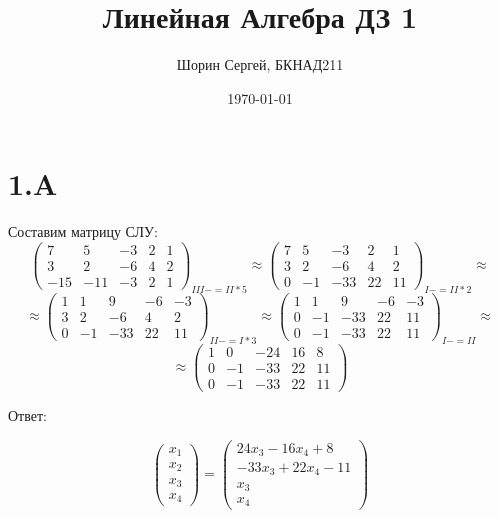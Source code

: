 \documentclass[a4paper]{article}
\author{Шорин Сергей, БКНАД211}
\title{Линейная Алгебра ДЗ 1}
\date{\today}
\begin{document}
\maketitle

\newpage

\section*{1.A}
Составим матрицу СЛУ:
\begin{equation*}
    \left(\begin{array}{rrrr|r}
   7 & 5 & -3 & 2 &1\\
   3 & 2 & -6 & 4 & 2\\
  -15 & -11 & -3 & 2 & 1 
   \end{array}\right)_{III -= II * 5}
   \approx
   \left(\begin{array}{rrrr|r}
   7 & 5 & -3 & 2 &1\\
   3 & 2 & -6 & 4 & 2\\
   0 & -1 & -33 & 22 & 11 
   \end{array}\right)_{I -= II * 2}
\approx
\end{equation*}
\begin{equation*}
\approx
   \left(\begin{array}{rrrr|r}
   1 & 1 & 9 & -6 & -3\\
   3 & 2 & -6 & 4 & 2\\
   0 & -1 & -33 & 22 & 11 
   \end{array}\right)_{II -= I * 3}
\approx
   \left(\begin{array}{rrrr|r}
   1 & 1 & 9 & -6 & -3\\
   0 & -1 & -33 & 22 & 11\\
   0 & -1 & -33 & 22 & 11 
   \end{array}\right)_{I -= II}
  \approx
\end{equation*}
\begin{equation*}
\approx
   \left(\begin{array}{rrrr|r}
   1 & 0 & -24 & 16 & 8\\
   0 & -1 & -33 & 22 & 11\\
   0 & -1 & -33 & 22 & 11 
   \end{array}\right)
\end{equation*}

Ответ:

\begin{equation*}
\begin{pmatrix}
  x_1 \\
  x_2\\
  x_3\\
  x_4
\end{pmatrix} = 
\begin{pmatrix}
  24 x_3 - 16x_4 + 8\\
  -33x_3 + 22x_4 - 11\\
	x_3\\
	x_4
\end{pmatrix}
\end{equation*}
\end{document}
